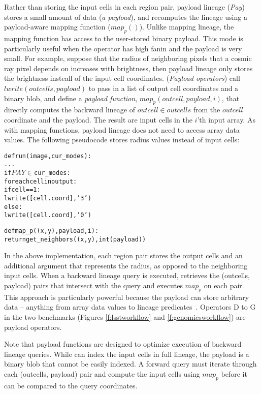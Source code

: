 Rather than storing the input cells in each region pair, payload lineage
({\it Pay}) stores a small amount of data ({\it a payload}), and recomputes the
lineage using a payload-aware mapping function ($map_p()$). Unlike mapping
lineage,  the mapping function has access to the user-stored binary
payload. This mode is particularly useful when the operator has high fanin
and the payload is very small.  For example, suppose that the radius of
neighboring pixels that a cosmic ray pixel depends on increases with
brightness, then  payload lineage only stores the brightness insteall of the
input cell coordinates.   ({\it Payload operators}) call $lwrite(outcells,
payload)$ to pass in a list of output cell coordinates and a binary blob,
and define a {\it payload function}, $map_{p}(outcell, payload,
i)$, that directly computes the backward lineage of $outcell \in outcells$ from
the $outcell$ coordinate and the payload.  The result are input cells in the
$i$'th input array.  As with mapping functions, payload lineage does not need
to access array data values.  The following pseudocode stores radius values
instead of input cells:

{\footnotesize
\begin{alltt}
  def run(image,cur_modes):
     ...
     if \(PAY \in\) cur_modes:
       for each cell in output:
         if cell == 1:
           lwrite([cell.coord], '3')
         else:
           lwrite([cell.coord], '0')

  def map_p((x,y), payload, i):
     return get_neighbors((x,y), int(payload))
\end{alltt}
}

In the above implementation, each region pair stores the output cells and an
additional argument that represents the radius, as opposed to the neighboring
input cells.  When a backward lineage query is executed, \sys{} retrieves
the (outcells, payload) pairs that intersect with the query and executes
$map_p$ on each pair.  This approach is particularly powerful because the
payload can store arbitrary data -- anything from array data values to
lineage predicates~\cite{panda}.  Operators D to G in the two benchmarks
(Figures \ref{f:lsstworkflow} and \ref{f:genomicsworkflow}) are payload
operators.

Note that payload functions are designed to optimize execution of
backward lineage queries.  While \sys{} can index the input cells in
full lineage, the payload is a binary blob that cannot be easily indexed.
A forward query must iterate through each (outcells, payload) pair and
compute the input cells using $map_p$ before it can be compared to
the query coordinates.

